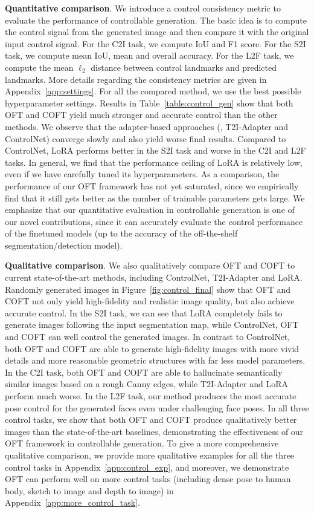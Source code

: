 \textbf{Quantitative comparison}. We introduce a control consistency metric to evaluate the performance of controllable generation. The basic idea is to compute the control signal from the generated image and then compare it with the original input control signal. For the C2I task, we compute IoU and F1 score. For the S2I task, we compute mean IoU, mean and overall accuracy. For the L2F task, we compute the mean $\ell_2$ distance between control landmarks and predicted landmarks. More details regarding the consistency metrics are given in Appendix~\ref{app:settings}. For all the compared method, we use the best possible hyperparameter settings. Results in Table~\ref{table:control_gen} show that both OFT and COFT yield much stronger and accurate control than the other methods. We observe that the adapter-based approaches (\eg, T2I-Adapter and ControlNet) converge slowly and also yield worse final results. Compared to ControlNet, LoRA performs better in the S2I task and worse in the C2I and L2F tasks. In general, we find that the performance ceiling of LoRA is relatively low, even if we have carefully tuned its hyperparameters. As a comparison, the performance of our OFT framework has not yet saturated, since we empirically find that it still gets better as the number of trainable parameters gets large. We emphasize that our quantitative evaluation in controllable generation is one of our novel contributions, since it can accurately evaluate the control performance of the finetuned models (up to the accuracy of the off-the-shelf segmentation/detection model).



\setlength{\columnsep}{11pt}


\textbf{Qualitative comparison}. We also qualitatively compare OFT and COFT to current state-of-the-art methods, including ControlNet, T2I-Adapter and LoRA. Randomly generated images in Figure~\ref{fig:control_final} show that OFT and COFT not only yield high-fidelity and realistic image quality, but also achieve accurate control. In the S2I task, we can see that LoRA completely fails to generate images following the input segmentation map, while ControlNet, OFT and COFT can well control the generated images. In contrast to ControlNet, both OFT and COFT are able to generate high-fidelity images with more vivid details and more reasonable geometric structures with far less model parameters. In the C2I task, both OFT and COFT are able to hallucinate semantically similar images based on a rough Canny edges, while T2I-Adapter and LoRA perform much worse. In the L2F task, our method produces the most accurate pose control for the generated faces even under challenging face poses. In all three control tasks, we show that both OFT and COFT produce qualitatively better images than the state-of-the-art baselines, demonstrating the effectiveness of our OFT framework in controllable generation. To give a more comprehensive qualitative comparison, we provide more qualitative examples for all the three control tasks in Appendix~\ref{app:control_exp}, and moreover, we demonstrate OFT can perform well on more control tasks (including dense pose to human body, sketch to image and depth to image) in Appendix~\ref{app:more_control_task}.

